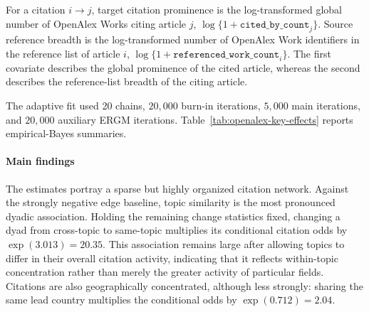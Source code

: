 \documentclass[preprint,12pt,authoryear]{elsarticle}
\begin{document}
For a citation \(i\to j\), target citation prominence is the log-transformed
global number of OpenAlex Works citing article \(j\),
\(\log\{1+\texttt{cited\_by\_count}_j\}\). Source reference breadth is the
log-transformed number of OpenAlex Work identifiers in the reference list of
article \(i\),
\(\log\{1+\texttt{referenced\_work\_count}_i\}\). The first covariate describes
the global prominence of the cited article, whereas the second describes the
reference-list breadth of the citing article.

The adaptive fit used 20 chains, \(20{,}000\) burn-in iterations,
\(5{,}000\) main iterations, and \(20{,}000\) auxiliary ERGM iterations.
Table~\ref{tab:openalex-key-effects} reports
empirical-Bayes summaries.


\paragraph{Main findings}
The estimates portray a sparse but highly organized citation network. Against
the strongly negative edge baseline, topic similarity is the most pronounced
dyadic association. Holding the remaining change statistics fixed, changing a
dyad from cross-topic to same-topic multiplies its conditional citation odds by
\(\exp(3.013)=20.35\). This association remains large after allowing topics to
differ in their overall citation activity, indicating that it reflects
within-topic concentration rather than merely the greater activity of
particular fields. Citations are also geographically concentrated, although
less strongly: sharing the same lead country multiplies the conditional odds
by \(\exp(0.712)=2.04\).
\end{document}
